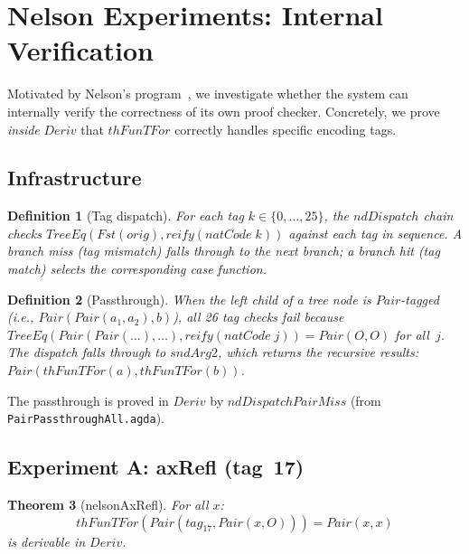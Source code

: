 \documentclass[11pt]{article}
\newtheorem{theorem}{Theorem}
\newtheorem{definition}[theorem]{Definition}
\begin{document}
\section{Nelson Experiments: Internal Verification}

Motivated by Nelson's program~\cite{nelson}, we investigate whether the
system can internally verify the correctness of its own proof checker.
Concretely, we prove \emph{inside} $\mathit{Deriv}$ that
$\mathit{thFunTFor}$ correctly handles specific encoding tags.

\subsection{Infrastructure}

\begin{definition}[Tag dispatch]
For each tag $k \in \{0, \ldots, 25\}$, the $\mathit{ndDispatch}$ chain
checks $\mathit{TreeEq}(\mathit{Fst}(\mathit{orig}),
\mathit{reify}(\mathit{natCode}\;k))$ against each tag in sequence.
A \emph{branch miss} (tag mismatch) falls through to the next branch;
a \emph{branch hit} (tag match) selects the corresponding case function.
\end{definition}

\begin{definition}[Passthrough]
When the left child of a tree node is $\mathit{Pair}$-tagged (i.e.,
$\mathit{Pair}(\mathit{Pair}(a_1,a_2), b)$), all 26 tag checks fail
because $\mathit{TreeEq}(\mathit{Pair}(\mathit{Pair}(\ldots), \ldots),
\mathit{reify}(\mathit{natCode}\;j)) = \mathit{Pair}(O,O)$ for all~$j$.
The dispatch falls through to $\mathit{sndArg2}$, which returns the
recursive results: $\mathit{Pair}(\mathit{thFunTFor}(a),
\mathit{thFunTFor}(b))$.
\end{definition}

The passthrough is proved in $\mathit{Deriv}$ by
$\mathit{ndDispatchPairMiss}$ (from \texttt{PairPassthroughAll.agda}).

\subsection{Experiment A: axRefl (tag~17)}

\begin{theorem}[nelsonAxRefl]
For all $x$:
\[
  \mathit{thFunTFor}(\mathit{Pair}(\mathit{tag}_{17},
  \mathit{Pair}(x, O))) = \mathit{Pair}(x, x)
\]
is derivable in $\mathit{Deriv}$.
\end{theorem}
\end{document}
